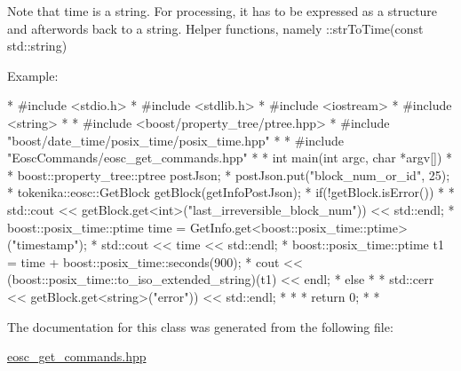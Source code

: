 Note that time is a string. For processing, it has to be expressed as a structure and afterwords back to a string. Helper functions, namely \+::str\+To\+Time(const std\+::string)

Example\+:

\begin{DoxyVerb}* #include <stdio.h>
* #include <stdlib.h>
* #include <iostream>
* #include <string>
*
* #include <boost/property_tree/ptree.hpp>
* #include "boost/date_time/posix_time/posix_time.hpp"
*
* #include "EoscCommands/eosc_get_commands.hpp"
*
* int main(int argc, char *argv[])
* {
* boost::property_tree::ptree postJson;
* postJson.put("block_num_or_id", 25);
* tokenika::eosc::GetBlock getBlock(getInfoPostJson);
* if(!getBlock.isError())
* {
*    std::cout << getBlock.get<int>("last_irreversible_block_num")) << std::endl;
*    boost::posix_time::ptime time = GetInfo.get<boost::posix_time::ptime>("timestamp");
*    std::cout << time << std::endl;
*    boost::posix_time::ptime t1 = time + boost::posix_time::seconds(900);
*    cout << (boost::posix_time::to_iso_extended_string)(t1) << endl;
* } else
* {
*    std::cerr << getBlock.get<string>("error")) << std::endl;
* }
*
* return 0;
* }
* \end{DoxyVerb}
 

The documentation for this class was generated from the following file\+:\begin{DoxyCompactItemize}
\item 
\hyperlink{eosc__get__commands_8hpp}{eosc\+\_\+get\+\_\+commands.\+hpp}\end{DoxyCompactItemize}
